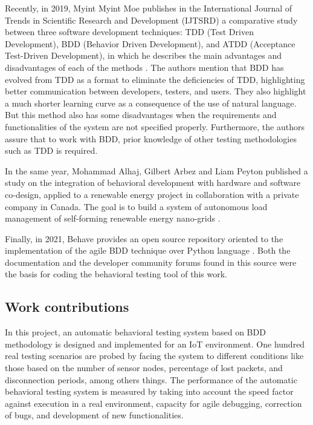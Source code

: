 \documentclass[journal]{IEEEtran}	%
\begin{document}
Recently, in 2019, Myint Myint Moe publishes in the International Journal of Trends in Scientific Research and Development (IJTSRD) a comparative study between three software development techniques: TDD (Test Driven Development), BDD (Behavior Driven Development), and ATDD (Acceptance Test-Driven Development), in which he describes the main advantages and disadvantages of each of the methods \cite{moe2019comparative}. The authors mention that BDD has evolved from TDD as a format to eliminate the deficiencies of TDD, highlighting better communication between developers, testers, and users. They also highlight a much shorter learning curve as a consequence of the use of natural language. But this method also has some disadvantages when the requirements and functionalities of the system are not specified properly. Furthermore, the authors assure that to work with BDD, prior knowledge of other testing methodologies such as TDD is required.

In the same year, Mohammad Alhaj, Gilbert Arbez and Liam Peyton published a study on the integration of behavioral development with hardware and software co-design, applied to a renewable energy project in collaboration with a private company in Canada. The goal is to build a system of autonomous load management of self-forming renewable energy nano-grids \cite{alhajapproach}.

Finally, in 2021, Behave provides an open source repository oriented to the implementation of the agile BDD technique over Python language \cite{behave2021github}. Both the documentation and the developer community forums found in this source were the basis for coding the behavioral testing tool of this work.


\subsection{Work contributions}

In this project, an automatic behavioral testing system based on BDD methodology is designed and implemented for an IoT environment. One hundred real testing scenarios are probed by facing the system to different conditions like those based on the number of sensor nodes, percentage of lost packets, and disconnection periods, among others things. The performance of the automatic behavioral testing system is measured by taking into account the speed factor against execution in a real environment, capacity for agile debugging, correction of bugs, and development of new functionalities.
\end{document}
